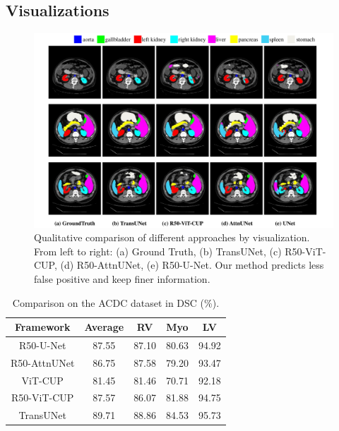 \documentclass[runningheads]{llncs}
\begin{document}
\vspace{-2em}
\subsection{Visualizations}

\begin{figure}[t]
    \centering
    \includegraphics[width=\textwidth]{fig-vis.pdf}
    \caption{Qualitative  comparison  of  different  approaches by visualization.  From  left  to  right:  (a) Ground Truth, (b) TransUNet, (c) R50-ViT-CUP, (d) R50-AttnUNet, (e) R50-U-Net. Our method predicts less false positive and keep finer information.}
    \label{fig:vis}
\end{figure}

\begin{table}[t]
\scriptsize
\begin{tabular}{c|c|ccc} 
\hline

Framework         & Average          & RV           & Myo        & LV    \\
\hline
R50-U-Net          & 87.55         & 87.10       & 80.63        & 94.92     \\
R50-AttnUNet      & 86.75         & 87.58       & 79.20       & 93.47       \\
ViT-CUP       & 81.45	& 81.46	& 70.71	 & 92.18    \\
R50-ViT-CUP       &  87.57	& 86.07	& 81.88	& 94.75  \\
TransUNet         & 89.71         & 88.86       & 84.53       & 95.73   \\
\hline
\end{tabular}
\caption{Comparison on the ACDC dataset in DSC (\%).}
\label{tab:acdc}
\end{table}
\end{document}
